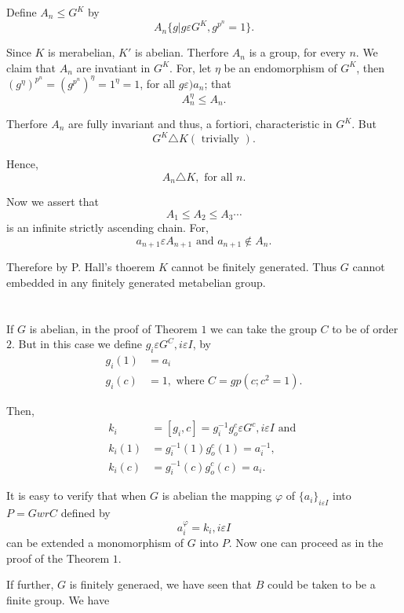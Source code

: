  Define $A_n \le G^K$ by
 $$
 A_n \bigg\{ g \bigg| g \varepsilon G^K,  g^{p^{n}} = 1\bigg\}.
 $$

 Since $K$ is merabelian, $K'$ is abelian. Therfore $A_n$ is a group,
 for every $n$. We claim that $A_n$ are invatiant in $G^K$. For, let
 $\eta$ be an endomorphism of $G^K$, then $(g^\eta)^{p^n} =
 (g^{p{^n}})^\eta = 1^\eta = 1$, for all $g \varepsilon ) a_n$; that   
 $$
 A_n^\eta \le A_n.
 $$

 Therfore $A_n$ are fully invariant and thus, a fortiori,
 characteristic in $G^K$. But 
 $$
 G^K \triangle K (\text { trivially }).
 $$

 Hence,
 $$
 A_n \triangle K, \text { for all } n.
 $$

 Now we assert that
 $$
 A_1 \le A_2 \le A_3 \cdots
 $$
 is an infinite strictly ascending chain. For,
 $$
 a_{n+1} \varepsilon A_{n+1} \text { and } a_{n+1} \notin A_n.
 $$

 Therefore by P. Hall's thoerem $K$ cannot be finitely generated. Thus
 $G$ cannot embedded in any finitely generated metabelian group. 

\section{}%

If $G$ is abelian, in the proof of Theorem $1$ we can take the group
$C$ to be of order $2$. But in this case we define $g_i \varepsilon
G^C, i \varepsilon I$, by 
\begin{align*}
  g_i (1) &= a_i\\
  g_i (c) &= 1, \text{ where } C = gp (c; c^2 = 1).
\end{align*}

Then,
\begin{align*}
  k_i & = [g_i,c]= g^{-1}_i g^c_o \varepsilon G^c, i \varepsilon I \text{ and }\\
  k_i(1) & = g^{-1}_i (1) g^c_o (1) = a^{-1}_i,\\
  k_i(c) & = g^{-1}_i(c) g^c_o(c) = a_i.  
\end{align*}

It is easy to verify that when $G$ is abelian the mapping $\varphi$ of
$\big\{ a_i \big\}_{i \varepsilon I}$ into $P= G wr C$ defined by   
$$
a^{\varphi}_i = k_i, i \varepsilon I
$$
can be extended a monomorphism of $G$ into $P$. Now one can proceed as
in the proof of the Theorem $1$. 

If further, $G$ is finitely generaed, we have seen that $B$ could be
taken to be a finite group. We have 

